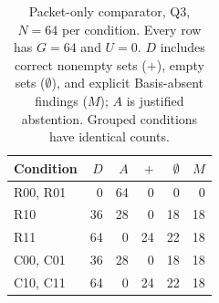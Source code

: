 \begin{table}[t]
\centering
\caption{Packet-only comparator, Q3, $N=64$ per condition. Every row has $G=64$ and $U=0$. $D$ includes correct nonempty sets ($+$), empty sets ($\emptyset$), and explicit Basis-absent findings ($M$); $A$ is justified abstention. Grouped conditions have identical counts.}
\label{tab:comparator}
\begin{tabular}{lrrrrr}
\toprule
Condition & $D$ & $A$ & $+$ & $\emptyset$ & $M$ \\
\midrule
R00, R01 & 0 & 64 & 0 & 0 & 0 \\
R10 & 36 & 28 & 0 & 18 & 18 \\
R11 & 64 & 0 & 24 & 22 & 18 \\
C00, C01 & 36 & 28 & 0 & 18 & 18 \\
C10, C11 & 64 & 0 & 24 & 22 & 18 \\
\bottomrule
\end{tabular}
\end{table}
